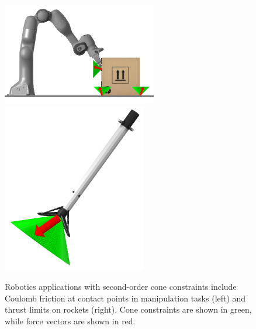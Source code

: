 \begin{figure}[H]
	\centering
	\includegraphics[width=.3\textwidth]{calipso/push_cones.png}
	\includegraphics[width=.175\textwidth]{calipso/rocket_cone.png}
	\caption[Robotics applications with conic and complementarity constraints]{Robotics applications with second-order cone constraints include Coulomb friction at contact points in manipulation tasks (left) and thrust limits on rockets (right). Cone constraints are shown in green, while force vectors are shown in red.}
	\label{calipso_second_order_cone_robots}
\end{figure}

